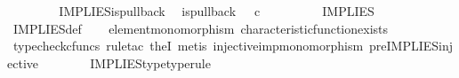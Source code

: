 \begin{isabellebody}
\ \ \ \ \isamarkupfalse%
\isanewline
\ \ \isamarkupfalse%
\isanewline
{}\isamarkupfalse%
%
\endisatagproof
{\isafoldproof}%
%
\isadelimproof
\isanewline
%
\endisadelimproof
\isanewline
{}\isamarkupfalse%
\ IMPLIES{\isacharunderscore}{\kern0pt}is{\isacharunderscore}{\kern0pt}pullback{\isacharcolon}{\kern0pt}\isanewline
\ \ {\isachardoublequoteopen}is{\isacharunderscore}{\kern0pt}pullback\ {\isacharparenleft}{\kern0pt}{\isasymone}{\isasymCoprod}{\isacharparenleft}{\kern0pt}{\isasymone}{\isasymCoprod}{\isasymone}{\isacharparenright}{\kern0pt}{\isacharparenright}{\kern0pt}\ {\isasymone}\ {\isacharparenleft}{\kern0pt}{\isasymOmega}{\isasymtimes}\isactrlsub c{\isasymOmega}{\isacharparenright}{\kern0pt}\ {\isasymOmega}\ {\isacharparenleft}{\kern0pt}{\isasymbeta}\isactrlbsub {\isacharparenleft}{\kern0pt}{\isasymone}{\isasymCoprod}{\isacharparenleft}{\kern0pt}{\isasymone}{\isasymCoprod}{\isasymone}{\isacharparenright}{\kern0pt}{\isacharparenright}{\kern0pt}\isactrlesub {\isacharparenright}{\kern0pt}\ {\isasymt}\ {\isacharparenleft}{\kern0pt}{\isasymlangle}{\isasymt}{\isacharcomma}{\kern0pt}\ {\isasymt}{\isasymrangle}{\isasymamalg}\ {\isacharparenleft}{\kern0pt}{\isasymlangle}{\isasymf}{\isacharcomma}{\kern0pt}\ {\isasymf}{\isasymrangle}\ {\isasymamalg}{\isasymlangle}{\isasymf}{\isacharcomma}{\kern0pt}\ {\isasymt}{\isasymrangle}{\isacharparenright}{\kern0pt}{\isacharparenright}{\kern0pt}\ IMPLIES{\isachardoublequoteclose}\isanewline
%
\isadelimproof
\ \ %
\endisadelimproof
%
\isatagproof
{}\isamarkupfalse%
\ IMPLIES{\isacharunderscore}{\kern0pt}def\isanewline
\ \ \isamarkupfalse%
\ element{\isacharunderscore}{\kern0pt}monomorphism\ characteristic{\isacharunderscore}{\kern0pt}function{\isacharunderscore}{\kern0pt}exists\isanewline
\ \ \isamarkupfalse%
\ {\isacharparenleft}{\kern0pt}typecheck{\isacharunderscore}{\kern0pt}cfuncs{\isacharcomma}{\kern0pt}\ rule{\isacharunderscore}{\kern0pt}tac\ the{}I{}{\isacharcomma}{\kern0pt}\ metis\ injective{\isacharunderscore}{\kern0pt}imp{\isacharunderscore}{\kern0pt}monomorphism\ pre{\isacharunderscore}{\kern0pt}IMPLIES{\isacharunderscore}{\kern0pt}injective{\isacharparenright}{\kern0pt}%
\endisatagproof
{\isafoldproof}%
%
\isadelimproof
\isanewline
%
\endisadelimproof
\ \ \ \ \ \ \isanewline
{}\isamarkupfalse%
\ IMPLIES{\isacharunderscore}{\kern0pt}type{\isacharbrackleft}{\kern0pt}type{\isacharunderscore}{\kern0pt}rule{\isacharbrackright}{\kern0pt}{\isacharcolon}{\kern0pt}\isanewline

\end{isabellebody}
